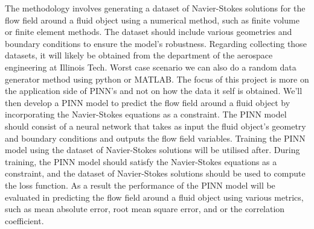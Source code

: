 The methodology involves generating a dataset of Navier-Stokes solutions for the flow field around a fluid object using a numerical method, such as finite volume or finite element methods. The dataset should include various geometries and boundary conditions to ensure the model's robustness. Regarding collecting those datasets, it will likely be obtained from the department of the aerospace engineering at Illinois Tech. Worst case scenario we can also do a random data generator method using python or MATLAB. The focus of this project is more on the application side of PINN's and not on how the data it self is obtained. We'll then develop a PINN model to predict the flow field around a fluid object by incorporating the Navier-Stokes equations as a constraint. The PINN model should consist of a neural network that takes as input the fluid object's geometry and boundary conditions and outputs the flow field variables. Training the PINN model using the dataset of Navier-Stokes solutions will be utilised after. During training, the PINN model should satisfy the Navier-Stokes equations as a constraint, and the dataset of Navier-Stokes solutions should be used to compute the loss function. As a result the performance of the PINN model will be evaluated in predicting the flow field around a fluid object using various metrics, such as mean absolute error, root mean square error, and or the correlation coefficient.
